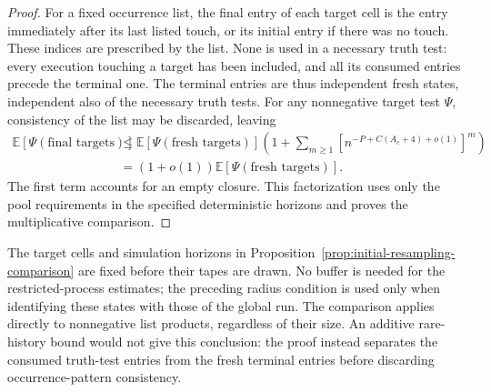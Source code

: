 \begin{proof}
For a fixed occurrence list, the final entry of each target cell is the
entry immediately after its last listed touch, or its initial entry if
there was no touch. These indices are prescribed by the list. None is
used in a necessary truth test: every execution touching a target has
been included, and all its consumed entries precede the terminal one.
The terminal entries are thus independent fresh states, independent also
of the necessary truth tests. For any nonnegative target test \(\Psi\),
consistency of the list may be discarded, leaving
\[
 \begin{aligned}
 \mathbb E[\Psi(\text{final targets})]
 &\le\mathbb E[\Psi(\text{fresh targets})]
    \left(1+\sum_{m\ge1}
           [n^{-P+C(A_c+4)+o(1)}]^m\right)\\
 &=(1+o(1))\mathbb E[\Psi(\text{fresh targets})].
 \end{aligned}
\]
The first term accounts for an empty closure. This factorization uses
only the pool requirements in the specified deterministic horizons and
proves the multiplicative comparison.
\end{proof}

\begin{remark}\label{rem:resampling-test-scope}
The target cells and simulation horizons in
Proposition~\ref{prop:initial-resampling-comparison} are fixed before
their tapes are drawn. No buffer is needed for the restricted-process
estimates; the preceding radius condition is used only when identifying
these states with those of the global run. The comparison applies directly to nonnegative
list products, regardless of their size. An additive rare-history bound
would not give this conclusion: the proof instead separates the consumed
truth-test entries from the fresh terminal entries before discarding
occurrence-pattern consistency.
\end{remark}
